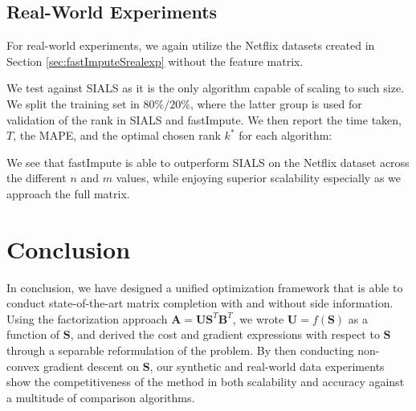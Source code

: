 \documentclass[twoside,11pt]{article}
\begin{document}
\subsection{Real-World Experiments}
For real-world experiments, we  again utilize the Netflix datasets created in Section \ref{sec:fastImputeSrealexp} without the feature matrix. 

We test against SIALS as it is the only algorithm capable of scaling to such size. We split the training set in $80\%/20\%$, where the latter group is used for validation of the rank in SIALS and fastImpute. We then report the time taken, $T$, the MAPE, and the optimal chosen rank $k^*$ for each algorithm:
\begin{table}[t]
	\centering
	\caption{Comparison of methods on Netflix data for fastImpute}
\end{table}
We see that fastImpute is able to outperform SIALS on the Netflix dataset across the different $n$ and $m$ values, while enjoying superior scalability especially as we approach the full matrix. 
\section{Conclusion}
\label{sec:mc_conclusion}
In conclusion, we have designed a unified optimization framework that is able to conduct state-of-the-art matrix completion with and without side information. Using the factorization approach $\bm{A}=\bm{U}\bm{S}^T\bm{B}^T$, we wrote $\bm{U}=f(\bm{S})$ as a function of $\bm{S}$, and derived the cost and gradient expressions with respect to $\bm{S}$ through a separable reformulation of the problem. By then conducting non-convex gradient descent on $\bm{S}$, our synthetic and real-world data experiments show the competitiveness of the method in both scalability and accuracy against a multitude of comparison algorithms.
\vfill
\pagebreak

\clearpage
\appendix
\end{document}
